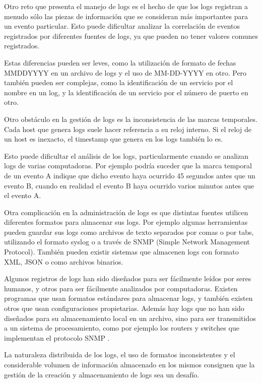 Otro reto que presenta el manejo de logs es el hecho de que los logs registran
a menudo sólo las piezas de información que se consideran más importantes para
un evento particular. Esto puede dificultar analizar la correlación de
eventos registrados por diferentes fuentes de logs, ya que pueden no tener
valores comunes registrados.

Estas diferencias pueden ser leves, como la utilización de formato de fechas
MMDDYYYY en un archivo de logs y el uso de MM-DD-YYYY en otro. Pero también
pueden ser complejas, como la identificación de un servicio por el nombre en un
log, y la identificación de un servicio por el número de puerto en otro.

Otro obstáculo en la gestión de logs es la inconsistencia de las marcas
temporales. Cada host que genera logs suele hacer referencia a su reloj
interno. Si el reloj de un host es inexacto, el timestamp que genera en los
logs también lo es.

Esto puede dificultar el análisis de los logs, particularmente cuando se
analizan logs de varias computadoras. Por ejemplo podría suceder que la marca
temporal de un evento A indique que dicho evento haya ocurrido 45 segundos
antes que un evento B, cuando en realidad el evento B haya ocurrido varios
minutos antes que el evento A.

Otra complicación en la administración de logs es que distintas fuentes
utilicen diferentes formatos para almacenar sus logs. Por ejemplo algunas
herramientas pueden guardar sus logs como archivos de texto separados por comas
o por tabs, utilizando el formato syslog o a través de SNMP (Simple Network
Management Protocol). También pueden existir sistemas que almacenen logs con
formato XML, JSON o como archivos binarios.

Algunos registros de logs han sido diseñados para ser fácilmente leídos por
seres humanos, y otros para ser fácilmente analizados por computadoras. Existen
programas que usan formatos estándares para almacenar logs, y también existen
otros que usan configuraciones propietarias. Además hay logs que no han sido
diseñados para su almacenamiento local en un archivo, sino para ser
transmitidos a un sistema de procesamiento, como por ejemplo los routers y
switches que implementan el protocolo SNMP
\cite[p.~23]{monitoreo:log_management_guide}.

La naturaleza distribuida de los logs, el uso de formatos inconsistentes y el
considerable volumen de información almacenado en los mismos consiguen que la
gestión de la creación y almacenamiento de logs sea un desafío.

